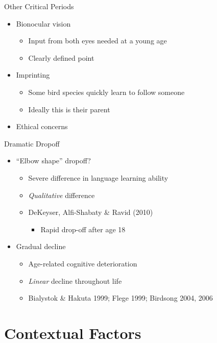 \documentclass{beamer}
\begin{document}
\begin{frame}{Other Critical Periods}
  \begin{itemize}
    \item Bionocular vision
    \begin{itemize}
      \item Input from both eyes needed at a young age
      \item Clearly defined point
    \end{itemize}
    \item Imprinting
    \begin{itemize}
      \item Some bird species quickly learn to follow someone
      \item Ideally this is their parent
    \end{itemize}
    \item Ethical concerns
  \end{itemize}
\end{frame}

\begin{frame}{Dramatic Dropoff}
  \begin{itemize}
    \item ``Elbow shape'' dropoff?
    \begin{itemize}
      \item Severe difference in language learning ability
      \item \emph{Qualitative} difference
      \item DeKeyser, Alfi-Shabaty \& Ravid (2010)
      \begin{itemize}
        \item Rapid drop-off after age 18
      \end{itemize}
    \end{itemize}
    \item Gradual decline
    \begin{itemize}
      \item Age-related cognitive deterioration
      \item \emph{Linear} decline throughout life
      \item Bialystok \& Hakuta 1999; Flege 1999; Birdsong 2004, 2006
    \end{itemize}
  \end{itemize}
\end{frame}


\section{Contextual Factors}
\end{document}
